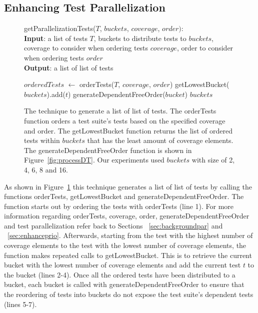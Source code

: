 \subsection{Enhancing Test Parallelization}
\label{sec:enhancepar}
\begin{figure}[t]
	getParallelizationTests($\mathit{T}$, $\mathit{buckets}$, $\mathit{coverage}$,
	$\mathit{order}):$\\
	\textbf{Input}: a list of tests $\mathit{T}$, buckets to distribute tests to
	$\mathit{buckets}$, coverage to consider when ordering tests 
	$\mathit{coverage}$, order to consider when ordering tests $\mathit{order}$\\
	\textbf{Output}: a list of list of tests\\
	\begin{algorithmic}[1]
		\vspace{-5mm}
		\STATE $\mathit{orderedTests}$ $\leftarrow$ orderTests($\mathit{T}$,
		$\mathit{coverage}$, $\mathit{order}$)
			\STATE getLowestBucket($\mathit{buckets}$).add($\mathit{t}$)
		\ENDFOR
			\STATE generateDependentFreeOrder($\mathit{bucket}$)
		\ENDFOR
		\RETURN $\mathit{buckets}$
	\end{algorithmic}
	\vspace{-3mm}
	\caption {
		The technique to generate a list of list of tests. The orderTests function
		orders a test suite's tests based on the specified coverage and order.
		The getLowestBucket function returns the list of ordered tests within
		$\mathit{buckets}$ that has the least amount of coverage elements. The
		generateDependentFreeOrder function is shown in Figure~\ref{fig:processDT}. Our
		experiments used $\mathit{buckets}$ with size of 2, 4, 6, 8 and 16.
	}
	\label{fig:parallelization}
\end{figure}

As shown in Figure~\ref{fig:parallelization} this technique generates a list of
list of tests by calling the functions orderTests, getLowestBucket and
generateDependentFreeOrder. The function starts out by ordering the tests with
orderTests (line 1). For more information regarding orderTests, coverage, order,
generateDependentFreeOrder and test parallelization refer back to Sections
 ~\ref{sec:backgroundpar} and ~\ref{sec:enhanceprio}. Afterwards, starting from
the test with the highest number of coverage elements to the test with the
lowest number of coverage elements, the function makes repeated calls to
getLowestBucket. This is to retrieve the current bucket with the lowest number
of coverage elements and add the current test $\mathit{t}$ to the bucket (lines
2-4). Once all the ordered tests have been distributed to a bucket, each bucket
is called with generateDependentFreeOrder to ensure that the reordering of tests
into buckets do not expose the test suite's dependent tests (lines 5-7).